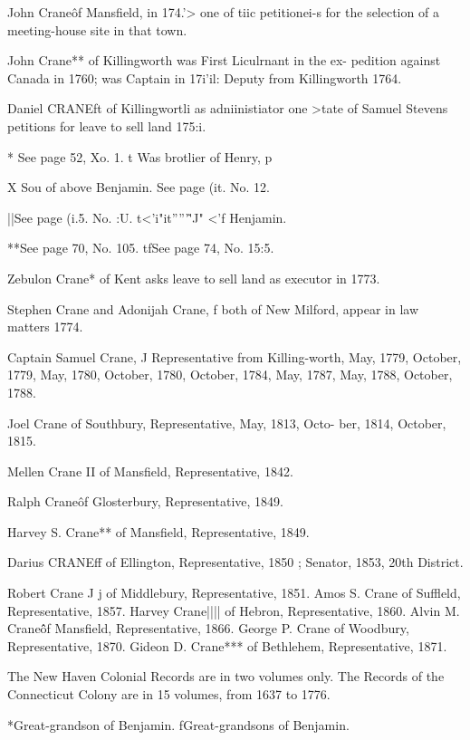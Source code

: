 John Crane\^ of Mansfield, in 174.'> one of tiic petitionei-s for 
the selection of a meeting-house site in that town. 

John Crane** of Killingworth was First Liculrnant in the ex- 
pedition against Canada in 1760; was Captain in 17i'il: Deputy 
from Killingworth 1764. 

Daniel CRANEft of Killingwortli as adniinistiator one >tate of 
Samuel Stevens petitions for leave to sell land 175:i. 



* See page 52, Xo. 1. t Was brotlier of Henry, p 

X Sou of above Benjamin.  See page (it. No. 12. 

||See page (i.5. No. :U. t<'i"it'''''\^'J" <'f Henjamin. 

**See page 70, No. 105. tfSee page 74, No. 15:5. 




Zebulon Crane* of Kent asks leave to sell land as executor in 
1773. 

Stephen Crane and Adonijah Crane, f both of New Milford, 
appear in law matters 1774. 

Captain Samuel Crane, J Representative from Killing-worth, 
May, 1779, October, 1779, May, 1780, October, 1780, October, 
1784, May, 1787, May, 1788, October, 1788. 

Joel Crane of Southbury, Representative, May, 1813, Octo- 
ber, 1814, October, 1815. 

Mellen Crane II of Mansfield, Representative, 1842. 

Ralph Crane\^ of Glosterbury, Representative, 1849. 

Harvey S. Crane** of Mansfield, Representative, 1849. 

Darius CRANEff of Ellington, Representative, 1850 ; Senator, 
1853, 20th District. 

Robert Crane J j of Middlebury, Representative, 1851. 
Amos S. Crane of Suffleld, Representative, 1857. 
Harvey Crane|||| of Hebron, Representative, 1860. 
Alvin M. Crane\^\^ of Mansfield, Representative, 1866. 
George P. Crane of Woodbury, Representative, 1870. 
Gideon D. Crane*** of Bethlehem, Representative, 1871. 

The New Haven Colonial Records are in two volumes only. The 
Records of the Connecticut Colony are in 15 volumes, from 1637 to 1776. 



*Great-grandson of Benjamin. fGreat-grandsons of Benjamin. 

